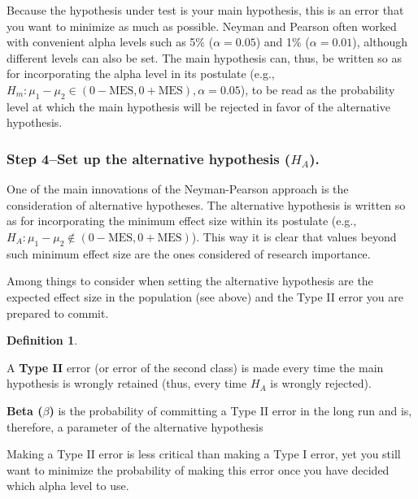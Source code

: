 \documentclass[
]{book}
\theoremstyle{definition}
\newtheorem{definition}{Definition}[chapter]
\theoremstyle{definition}
\theoremstyle{definition}
\theoremstyle{definition}
\theoremstyle{remark}
\begin{document}
Because the hypothesis under test is your main hypothesis, this is an error that you want to minimize as much as possible. Neyman and Pearson often worked with convenient alpha levels such as 5\% (\(\alpha = 0.05\)) and 1\% (\(\alpha= 0.01\)), although different levels can also be set. The main hypothesis can, thus, be written so as for incorporating the alpha level in its postulate (e.g., \(H_m: \mu_1-\mu_2 \in (0 - \mbox{MES}, 0 + \mbox{MES}), \alpha = 0.05\)), to be read as the probability level at which the main hypothesis will be rejected in favor of the alternative hypothesis.

\hypertarget{step-4set-up-the-alternative-hypothesis-h_a.}{%
\subsubsection*{\texorpdfstring{Step 4--Set up the alternative hypothesis (\(H_A\)).}{Step 4--Set up the alternative hypothesis (H\_A).}}\label{step-4set-up-the-alternative-hypothesis-h_a.}}

One of the main innovations of the Neyman-Pearson approach is the consideration of alternative hypotheses. The alternative hypothesis is written so as for incorporating the minimum effect size within its postulate (e.g., \(H_A: \mu_1-\mu_2 \notin (0 - \mbox{MES}, 0 + \mbox{MES})\)). This way it is clear that values beyond such minimum effect size are the ones considered of research importance.

Among things to consider when setting the alternative hypothesis are the expected effect size in the population (see above) and the Type II error you are prepared to commit.

\begin{definition}
\protect\hypertarget{def:unlabeled-div-317}{}\label{def:unlabeled-div-317}

A \textbf{Type II} error (or error of the second class) is made every time the main hypothesis is wrongly retained (thus, every time \(H_A\) is wrongly rejected).

\textbf{Beta (\(\beta\))} is the probability of committing a Type II error in the long run and is, therefore, a parameter of the alternative hypothesis

\end{definition}

Making a Type II error is less critical than making a Type I error, yet you still want to minimize the probability of making this error once you have decided which alpha level to use.
\end{document}
